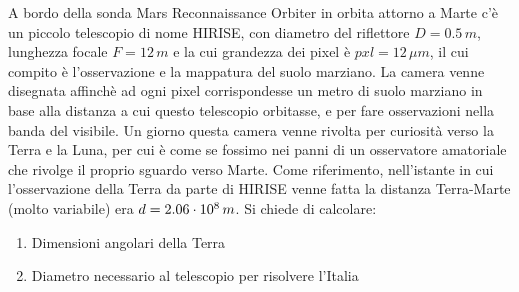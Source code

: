 \begin{exrc}
	A bordo	della sonda Mars Reconnaissance Orbiter in orbita attorno a Marte c'è un piccolo telescopio di nome HIRISE, con diametro del riflettore $D=0.5\, m$, lunghezza focale $F=12\, m$ e la cui grandezza dei pixel è $pxl=12\, \mu m$, il cui compito è l'osservazione e la mappatura del suolo marziano. La camera venne disegnata affinchè ad ogni pixel corrispondesse un metro di suolo marziano in base alla distanza a cui questo telescopio orbitasse, e per fare osservazioni nella banda del visibile. Un giorno questa camera venne rivolta per curiosità verso la Terra e la Luna, per cui è come se fossimo nei panni di un osservatore amatoriale che rivolge il proprio sguardo verso Marte. Come riferimento, nell'istante in cui l'osservazione della Terra da parte di HIRISE venne fatta la distanza Terra-Marte (molto variabile) era $d=2.06\cdot 10^{8}\, m$. Si chiede di calcolare:
	\begin{enumerate}
		\item Dimensioni angolari della Terra
		\item Diametro necessario al telescopio per risolvere l'Italia
	\end{enumerate}
\end{exrc}

